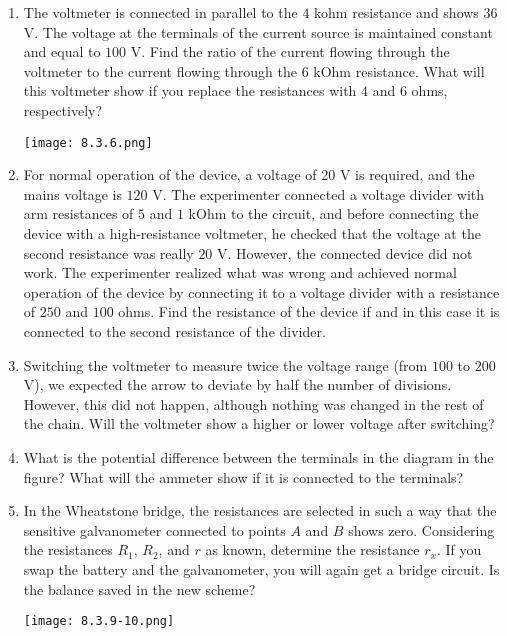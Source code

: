\documentclass{article}
\begin{document}
\begin{enumerate}[label=8.3.\arabic*]
\item The voltmeter is connected in parallel to the $4$ kohm resistance and shows $36$ V. The voltage at the terminals of the current source is maintained constant and equal to $100$ V. Find the ratio of the current flowing through the voltmeter to the current flowing through the $6$ kOhm resistance. What will this voltmeter show if you replace the resistances with $4$ and $6$ ohms, respectively?

\begin{center}
    \texttt{[image: 8.3.6.png]}
\end{center}


\item For normal operation of the device, a voltage of $20$ V is required, and the mains voltage is $120$ V. The experimenter connected a voltage divider with arm resistances of $5$ and $1$ kOhm to the circuit, and before connecting the device with a high-resistance voltmeter, he checked that the voltage at the second resistance was really $20$ V. However, the connected device did not work. The experimenter realized what was wrong and achieved normal operation of the device by connecting it to a voltage divider with a resistance of $250$ and $100$ ohms. Find the resistance of the device if and in this case it is connected to the second resistance of the divider.

\item Switching the voltmeter to measure twice the voltage range (from $100$ to $200$ V), we expected the arrow to deviate by half the number of divisions. However, this did not happen, although nothing was changed in the rest of the chain. Will the voltmeter show a higher or lower voltage after switching?

\item What is the potential difference between the terminals in the diagram in the figure? What will the ammeter show if it is connected to the terminals?

\item In the Wheatstone bridge, the resistances are selected in such a way that the sensitive galvanometer connected to points $A$ and $B$ shows zero. Considering the resistances $R_1$, $R_2$, and $r$ as known, determine the resistance $r_x$. If you swap the battery and the galvanometer, you will again get a bridge circuit. Is the balance saved in the new scheme?

\begin{center}
    \texttt{[image: 8.3.9-10.png]}
\end{center}



\end{enumerate}
\end{document}
